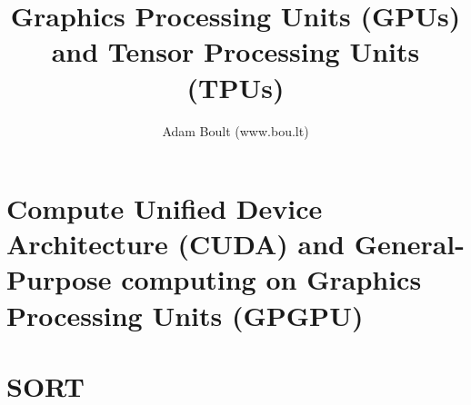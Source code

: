 \documentclass[oneside]{book}
\begin{document}
\author{Adam Boult (www.bou.lt)}
\title{Graphics Processing Units (GPUs) and Tensor Processing Units (TPUs)}
\maketitle

\setcounter{tocdepth}{0}
\tableofcontents




\part{Compute Unified Device Architecture (CUDA) and General-Purpose computing on Graphics Processing Units (GPGPU)}

\part{SORT}

\end{document}
